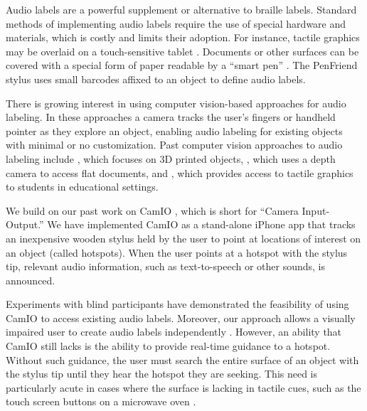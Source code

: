 \documentclass[runningheads]{res/templates/llncs}
\begin{document}
Audio labels are a powerful supplement or alternative to braille labels.
Standard methods of implementing audio labels require the use of special
hardware and materials, which is costly and limits their adoption. For
instance, tactile graphics may be overlaid on a touch-sensitive tablet
\cite{TalkingTactileTablet}. Documents or other surfaces can be covered
with a special form of paper readable by a ``smart pen''
\cite{mieleTalkingTactileApps2010}. The PenFriend
\cite{kendrickPenFriendTouchMemo2011} stylus uses small barcodes affixed
to an object to define audio labels.

There is growing interest in using computer vision-based approaches for
audio labeling. In these approaches a camera tracks the user's fingers
or handheld pointer as they explore an object, enabling audio labeling
for existing objects with minimal or no customization. Past computer
vision approaches to audio labeling include
\cite{shiMarkitTalkitLowBarrier2017}, which focuses on 3D printed
objects, \cite{thevinAugmentedRealityPeople2018}, which uses a depth
camera to access flat documents, and
\cite{fuscoTactileGraphicsHelper2015}, which provides access to tactile
graphics to students in educational settings.

We build on our past work on CamIO
\cite{shenCamIO3DComputer2013,coughlanEvaluatingAuthorUser2017,coughlanTowardsAccessibleAudioLabeling2020},
which is short for ``Camera Input-Output.'' We have implemented CamIO as
a stand-alone iPhone app that tracks an inexpensive wooden stylus held
by the user to point at locations of interest on an object (called
hotspots). When the user points at a hotspot with the stylus tip,
relevant audio information, such as text-to-speech or other sounds, is
announced.

Experiments with blind participants have demonstrated the feasibility of
using CamIO to access existing audio labels. Moreover, our approach
allows a visually impaired user to create audio labels independently
\cite{coughlanTowardsAccessibleAudioLabeling2020}. However, an ability
that CamIO still lacks is the ability to provide real-time guidance to a
hotspot. Without such guidance, the user must search the entire surface
of an object with the stylus tip until they hear the hotspot they are
seeking. This need is particularly acute in cases where the surface is
lacking in tactile cues, such as the touch screen buttons on a microwave
oven \cite{coughlanTowardsAccessibleAudioLabeling2020}.
\end{document}
